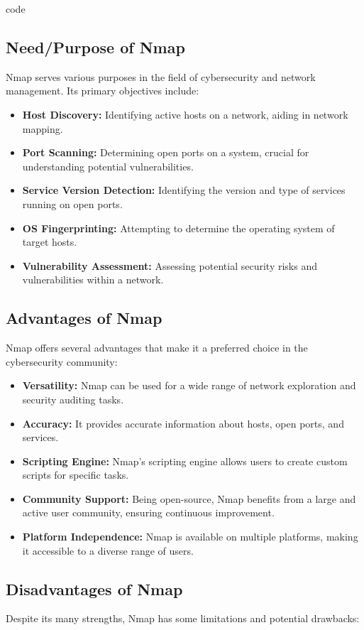 code \documentclass[11pt]{article}
\begin{document}
\subsection{Need/Purpose of Nmap}
Nmap serves various purposes in the field of cybersecurity and network management. Its primary objectives include:

\begin{itemize}
    \item \textbf{Host Discovery:} Identifying active hosts on a network, aiding in network mapping.
    \item \textbf{Port Scanning:} Determining open ports on a system, crucial for understanding potential vulnerabilities.
    \item \textbf{Service Version Detection:} Identifying the version and type of services running on open ports.
    \item \textbf{OS Fingerprinting:} Attempting to determine the operating system of target hosts.
    \item \textbf{Vulnerability Assessment:} Assessing potential security risks and vulnerabilities within a network.
\end{itemize}

\subsection{Advantages of Nmap}
Nmap offers several advantages that make it a preferred choice in the cybersecurity community:

\begin{itemize}
    \item \textbf{Versatility:} Nmap can be used for a wide range of network exploration and security auditing tasks.
    \item \textbf{Accuracy:} It provides accurate information about hosts, open ports, and services.
    \item \textbf{Scripting Engine:} Nmap's scripting engine allows users to create custom scripts for specific tasks.
    \item \textbf{Community Support:} Being open-source, Nmap benefits from a large and active user community, ensuring continuous improvement.
    \item \textbf{Platform Independence:} Nmap is available on multiple platforms, making it accessible to a diverse range of users.
\end{itemize}

\subsection{Disadvantages of Nmap}
Despite its many strengths, Nmap has some limitations and potential drawbacks:
\end{document}
